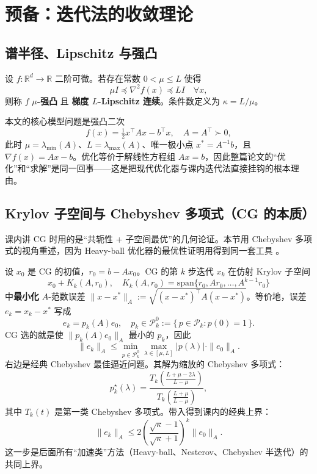 \section{预备：迭代法的收敛理论}
\label{sec:prelim}

\subsection{谱半径、Lipschitz 与强凸}

设 $f:\mathbb{R}^d\to\mathbb{R}$ 二阶可微。若存在常数 $0<\mu\le L$ 使得
\[
  \mu I \preceq \nabla^2 f(x) \preceq L I \quad \forall x,
\]
则称 $f$ \textbf{$\mu$-强凸} 且 \textbf{梯度 $L$-Lipschitz 连续}。条件数定义为 $\kappa=L/\mu$。

本文的核心模型问题是强凸二次
\[
  f(x) = \tfrac{1}{2} x^\top A x - b^\top x, \quad A=A^\top \succ 0,
\]
此时 $\mu = \lambda_{\min}(A)$、$L = \lambda_{\max}(A)$、唯一极小点 $x^*=A^{-1}b$，且 $\nabla f(x)=Ax-b$。优化等价于解线性方程组 $Ax=b$，因此整篇论文的``优化''和``求解''是同一回事——这是把现代优化器与课内迭代法直接挂钩的根本理由。

\subsection{Krylov 子空间与 Chebyshev 多项式（CG 的本质）}

课内讲 CG 时用的是``共轭性 + 子空间最优''的几何论证。本节用 Chebyshev 多项式的视角重述，因为 Heavy-ball 优化器的最优性证明用得到同一套工具 \cite{trefethen1997,saad2003}。

设 $x_0$ 是 CG 的初值，$r_0 = b - A x_0$。CG 的第 $k$ 步迭代 $x_k$ 在仿射 Krylov 子空间
\[
  x_0 + K_k(A, r_0), \quad K_k(A, r_0) = \mathrm{span}\{r_0, A r_0, \ldots, A^{k-1} r_0\}
\]
中\textbf{最小化} $A$-范数误差 $\|x - x^*\|_A := \sqrt{(x-x^*)^\top A (x-x^*)}$。等价地，误差 $e_k = x_k - x^*$ 写成
\[
  e_k = p_k(A) e_0, \quad p_k \in \mathcal{P}_k^0 := \{\,p \in \mathcal{P}_k : p(0) = 1\,\}.
\]
CG 选的就是使 $\|p_k(A) e_0\|_A$ 最小的 $p_k$，因此
\[
  \|e_k\|_A \le \min_{p \in \mathcal{P}_k^0} \max_{\lambda \in [\mu, L]} |p(\lambda)| \cdot \|e_0\|_A.
\]
右边是经典 Chebyshev 最佳逼近问题。其解为缩放的 Chebyshev 多项式：
\[
  p_k^\star(\lambda) = \frac{T_k\!\left(\frac{L+\mu-2\lambda}{L-\mu}\right)}{T_k\!\left(\frac{L+\mu}{L-\mu}\right)},
\]
其中 $T_k(t)$ 是第一类 Chebyshev 多项式。带入得到课内的经典上界：
\begin{equation}
  \|e_k\|_A \le 2 \left(\frac{\sqrt{\kappa} - 1}{\sqrt{\kappa} + 1}\right)^k \|e_0\|_A.
  \label{eq:cg-bound}
\end{equation}
这一步是后面所有``加速类''方法（Heavy-ball、Nesterov、Chebyshev 半迭代）的共同上界。


